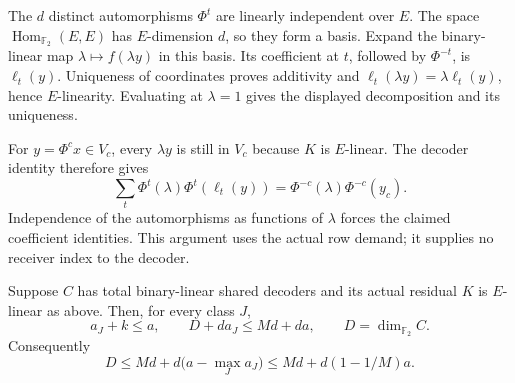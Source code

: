 \begin{outline}
The $d$ distinct automorphisms $\Phi^t$ are linearly independent over $E$.
The space $\operatorname{Hom}_{\mathbb F_2}(E,E)$ has $E$-dimension $d$,
so they form a basis. Expand the binary-linear map
$\lambda\mapsto f(\lambda y)$ in this basis. Its coefficient at $t$,
followed by $\Phi^{-t}$, is $\ell_t(y)$. Uniqueness of coordinates proves
additivity and
$\ell_t(\lambda y)=\lambda\ell_t(y)$, hence $E$-linearity. Evaluating
at $\lambda=1$ gives the displayed decomposition and its uniqueness.

For $y=\Phi^c x\in V_c$, every $\lambda y$ is still in $V_c$ because
$K$ is $E$-linear. The decoder identity therefore gives
\[
 \sum_t\Phi^t(\lambda)\Phi^t(\ell_t(y))
       =\Phi^{-c}(\lambda)\Phi^{-c}(y_c).
\]
Independence of the automorphisms as functions of $\lambda$ forces the
claimed coefficient identities. This argument uses the actual row demand;
it supplies no receiver index to the decoder.
\end{outline}

\begin{theorem}\label{thm:field-linear-active}
Suppose $C$ has total binary-linear shared decoders and its actual residual
$K$ is $E$-linear as above. Then, for every class $J$,
\begin{equation}\label{eq:field-linear-class}
 a_J+k\le a,\qquad
 D+d a_J\le Md+da,\qquad D=\dim_{\mathbb F_2}C.
\end{equation}
Consequently
\[
 D\le Md+d\bigl(a-\max_J a_J\bigr)
       \le Md+d(1-1/M)a.
\]
\end{theorem}

